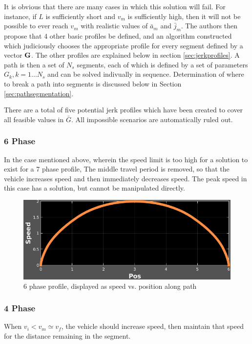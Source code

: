 \documentclass[letterpaper, 10 pt, conference]{ieeeconf}  %
\begin{document}
It is obvious that there are many cases in which this solution will fail.
For instance, if $L$ is sufficiently short and $v_m$ is sufficiently high, then it will not be possible to ever reach $v_m$ with realistic values of $\bar{a}_m$ and $\bar{j}_m$.
The authors then propose that 4 other basic profiles be defined, and an algorithm constructed which judiciously chooses the appropriate profile for every segment defined by a vector $\bf{G}$.
The other profiles are explained below in section \ref{sec:jerkprofiles}.
A path is then a set of $N_s$ segments, each of which is defined by a set of parameters $G_k, k = 1 ... N_s$ and can be solved indivually in sequence.
Determination of where to break a path into segments is discussed below in Section \ref{sec:pathsegmentation}.

There are a total of five potential jerk profiles which have been created to cover all feasible values in $\bar{G}$. All impossible scenarios are automatically ruled out.

\subsubsection{6 Phase}
\label{sec:6phase}

In the case mentioned above, wherein the speed limit is too high for a solution to exist for a 7 phase profile, The middle travel period is removed, so that the vehicle increases speed and then immediately decreases speed. 
The peak speed in this case has a solution, but cannot be manipulated directly.

\begin{figure}[thpb]
  \centering
  \includegraphics[width=0.7\columnwidth]{graphics/6phase_v(s).png}
  \caption{6 phase profile, displayed as speed vs. position along path}
  \label{fig:6phaseprofile}
\end{figure}

\subsubsection{4 Phase}
\label{sec:4phase}

When $v_i < v_m \simeq v_f$, the vehicle should increase speed, then maintain that speed for the distance remaining in the segment.
\end{document}
